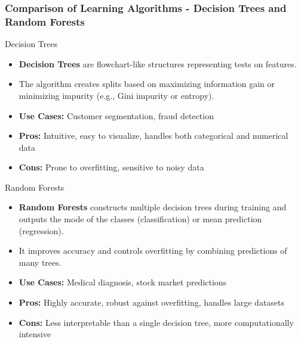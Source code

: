 \documentclass[aspectratio=169]{beamer}
\begin{document}
\begin{frame}[fragile]
    \frametitle{Comparison of Learning Algorithms - Decision Trees and Random Forests}
    \begin{block}{Decision Trees}
        \begin{itemize}
            \item \textbf{Decision Trees} are flowchart-like structures representing tests on features.
            \item The algorithm creates splits based on maximizing information gain or minimizing impurity (e.g., Gini impurity or entropy).
        \end{itemize}
        \begin{itemize}
            \item \textbf{Use Cases:} Customer segmentation, fraud detection
            \item \textbf{Pros:} Intuitive, easy to visualize, handles both categorical and numerical data
            \item \textbf{Cons:} Prone to overfitting, sensitive to noisy data
        \end{itemize}
    \end{block}

    \begin{block}{Random Forests}
        \begin{itemize}
            \item \textbf{Random Forests} constructs multiple decision trees during training and outputs the mode of the classes (classification) or mean prediction (regression).
            \item It improves accuracy and controls overfitting by combining predictions of many trees. 
        \end{itemize}
        \begin{itemize}
            \item \textbf{Use Cases:} Medical diagnosis, stock market predictions
            \item \textbf{Pros:} Highly accurate, robust against overfitting, handles large datasets
            \item \textbf{Cons:} Less interpretable than a single decision tree, more computationally intensive
        \end{itemize}
    \end{block}
\end{frame}
\end{document}
